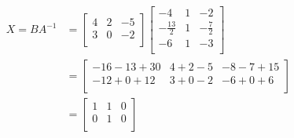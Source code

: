 \documentclass[11pt]{article}
\begin{document}
\begin{align*}
  X = BA^{-1} &= \begin{bmatrix}
                   4 & 2 & -5\\
                   3 & 0 & -2\\
                 \end{bmatrix}
  \begin{bmatrix}
    -4 & 1 & -2\\
    -\frac{13}{2} & 1 & - \frac{7}{2}\\
    -6 & 1 & -3\\
  \end{bmatrix}
  \\
              &= \begin{bmatrix}
                   -16 - 13 + 30 & 4 + 2 - 5 & - 8 - 7 + 15\\
                   -12 + 0 + 12  & 3 + 0 - 2 & - 6 +0 +6 \\
                 \end{bmatrix}
  \\
              &= \begin{bmatrix}
                   1 & 1 & 0\\
                   0 & 1 & 0\\
                 \end{bmatrix}
\end{align*}
\end{document}

